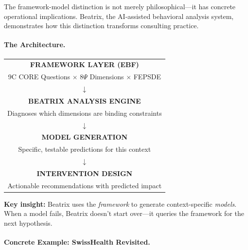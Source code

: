 The framework-model distinction is not merely philosophical---it has concrete
operational implications. Beatrix, the AI-assisted behavioral analysis system,
demonstrates how this distinction transforms consulting practice.

\paragraph{The Architecture.}

\begin{tcolorbox}[colback=purple!5!white, colframe=purple!75!black,
    title=\textbf{Beatrix: Framework-to-Model Generator}]

\begin{center}
\begin{tabular}{@{}c@{}}
\textbf{FRAMEWORK LAYER (EBF)} \\
9C CORE Questions $\times$ 8$\Psi$ Dimensions $\times$ FEPSDE \\
$\downarrow$ \\
\textbf{BEATRIX ANALYSIS ENGINE} \\
Diagnoses which dimensions are binding constraints \\
$\downarrow$ \\
\textbf{MODEL GENERATION} \\
Specific, testable predictions for this context \\
$\downarrow$ \\
\textbf{INTERVENTION DESIGN} \\
Actionable recommendations with predicted impact \\
\end{tabular}
\end{center}

\textbf{Key insight:} Beatrix uses the \textit{framework} to generate context-specific \textit{models}.
When a model fails, Beatrix doesn't start over---it queries the framework for the next hypothesis.

\end{tcolorbox}

\paragraph{Concrete Example: SwissHealth Revisited.}

